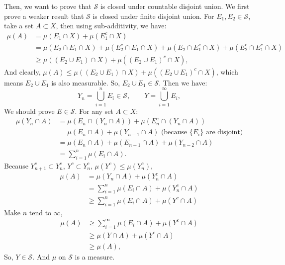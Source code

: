 \documentclass[12pt]{article}
\newenvironment{solution}{\begin{tcolorbox}[colback=white, colframe=black!50, breakable, title=Solution. ]\setlength{\parskip}{0.8em}}{\end{tcolorbox}}
\begin{document}
\begin{solution}
        Then, we want to prove that $\mathscr{S}$ is closed under countable disjoint union. We first prove a weaker result that $\mathscr{S}$ is closed under finite disjoint union. For $E_1,E_2\in\mathscr{S}$, take a set $A\subset X$, then using sub-additivity, we have: 
        \[
            \begin{aligned}
                \mu(A)&=\mu(E_1\cap X)+\mu(E_1^c\cap X)\\
                &=\mu(E_2\cap E_1\cap X)+\mu(E_2^c\cap E_1\cap X)+\mu(E_2\cap E_1^c\cap X)+\mu(E_2^c\cap E_1^c\cap X)\\
                &\geqslant\mu((E_2\cup E_1)\cap X)+\mu((E_2\cup E_1)^c\cap X), 
            \end{aligned}
        \]
        And clearly, $\mu(A)\leqslant\mu((E_2\cup E_1)\cap X)+\mu((E_2\cup E_1)^c\cap X)$, which means $E_2\cup E_1$ is also measurable. So, $E_2\cup E_1\in\mathscr{S}$. Then we have: 
        \[Y_n=\bigcup_{i=1}^nE_i\in\mathscr{S},\qquad Y=\bigcup_{i=1}^\infty E_i, \]
        We should prove $E\in\mathscr{S}$. For any set $A\subset X$: 
        \[
            \begin{aligned}
                \mu\left(Y_{n} \cap A\right) &=\mu\left(E_{n} \cap\left(Y_{n} \cap A\right)\right)+\mu\left(E_{n}^{c} \cap\left(Y_{n} \cap A\right)\right) \\
                &=\mu\left(E_{n} \cap A\right)+\mu\left(Y_{n-1} \cap A\right) \text{  (because $\{E_i\}$ are disjoint)}\\
                &=\mu\left(E_{n} \cap A\right)+\mu\left(E_{n-1} \cap A\right)+\mu\left(Y_{n-2} \cap A\right)\\
                &=\sum_{i=1}^{n} \mu\left(E_{i} \cap A\right). 
            \end{aligned}
        \]
        Because $Y_{n+1}^c\subset Y_{n}^c$, $Y^c\subset Y_{n}^c$, $\mu(Y^c)\leqslant\mu(Y_n^c)$, 
        \[
            \begin{aligned}
                \mu(A)&=\mu\left(Y_{n} \cap A\right)+\mu\left(Y_{n}^{c} \cap A\right) \\
                &=\sum_{i=1}^{n} \mu\left(E_{i} \cap A\right)+\mu\left(Y_{n}^{c} \cap A\right) \\
                &\geqslant \sum_{i=1}^{n} \mu\left(E_{i} \cap A\right)+\mu\left(Y^{c} \cap A\right)
            \end{aligned}
        \]
        Make $n$ tend to $\infty$, 
        \[
            \begin{aligned}
                \mu(A) &\geqslant \sum_{i=1}^{\infty} \mu\left(E_{i} \cap A\right)+\mu\left(Y^{c} \cap A\right)\\
                 & \geqslant \mu(Y \cap A)+\mu\left(Y^{c} \cap A\right) \\
                & \geqslant \mu(A), 
            \end{aligned}
        \]
        So, $Y\in\mathscr{S}$. And $\mu$ on $\mathscr{S}$ is a measure. 
    \end{solution}
\end{document}
